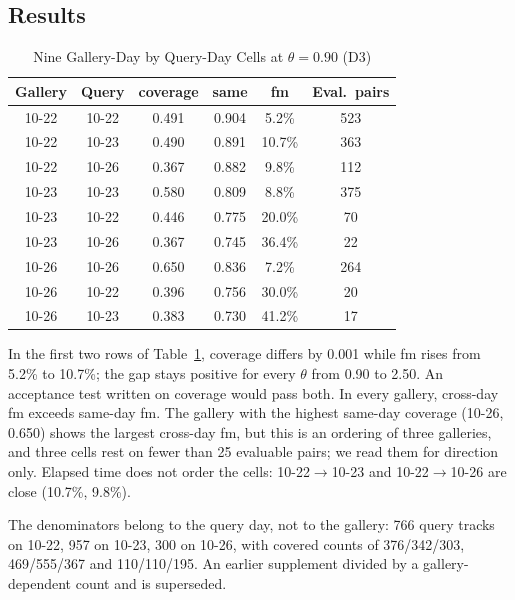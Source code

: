 \documentclass[journal]{IEEEtran}
\newcommand{\ra}{$\rightarrow$}
\begin{document}
\subsection{Results}
\begin{table}[t]
\caption{Nine Gallery-Day by Query-Day Cells at $\theta = 0.90$ (D3)}\label{tab:xday}
\centering
\setlength{\tabcolsep}{4pt}
\begin{tabular}{@{}cccccc@{}}
\toprule
Gallery & Query & coverage & same & fm & Eval.\ pairs\\
\midrule
10-22 & 10-22 & 0.491 & 0.904 & 5.2\% & 523\\
10-22 & 10-23 & 0.490 & 0.891 & 10.7\% & 363\\
10-22 & 10-26 & 0.367 & 0.882 & 9.8\% & 112\\
10-23 & 10-23 & 0.580 & 0.809 & 8.8\% & 375\\
10-23 & 10-22 & 0.446 & 0.775 & 20.0\% & 70\\
10-23 & 10-26 & 0.367 & 0.745 & 36.4\% & 22\\
10-26 & 10-26 & 0.650 & 0.836 & 7.2\% & 264\\
10-26 & 10-22 & 0.396 & 0.756 & 30.0\% & 20\\
10-26 & 10-23 & 0.383 & 0.730 & 41.2\% & 17\\
\bottomrule
\end{tabular}
\end{table}

In the first two rows of Table~\ref{tab:xday}, coverage differs by 0.001 while fm rises from 5.2\% to 10.7\%; the gap stays positive for every $\theta$ from 0.90 to 2.50. An acceptance test written on coverage would pass both. In every gallery, cross-day fm exceeds same-day fm. The gallery with the highest same-day coverage (10-26, 0.650) shows the largest cross-day fm, but this is an ordering of three galleries, and three cells rest on fewer than 25 evaluable pairs; we read them for direction only. Elapsed time does not order the cells: 10-22\ra10-23 and 10-22\ra10-26 are close (10.7\%, 9.8\%).

The denominators belong to the query day, not to the gallery: 766 query tracks on 10-22, 957 on 10-23, 300 on 10-26, with covered counts of 376/342/303, 469/555/367 and 110/110/195. An earlier supplement divided by a gallery-dependent count and is superseded.
\end{document}

